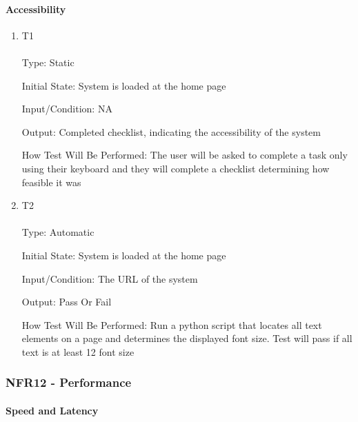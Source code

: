 \documentclass[12pt, titlepage]{article}
\begin{document}
\paragraph{Accessibility}
\begin{enumerate}
\item {T1\\}\\
Type: Static

Initial State: System is loaded at the home page

Input/Condition: NA

Output: Completed checklist, indicating the accessibility of the system

How Test Will Be Performed: The user will be asked to complete a task only using their keyboard and they will complete a checklist determining how feasible it was
\item {T2\\}\\
Type: Automatic

Initial State: System is loaded at the home page

Input/Condition: The URL of the system

Output: Pass Or Fail

How Test Will Be Performed: Run a python script that locates all text elements on a page and determines the displayed font size. Test will pass if all text is at least 12 font size
\end{enumerate}

\hypertarget{nfr12}{}
\subsubsection{NFR12 - Performance}
		
\paragraph{Speed and Latency}
\end{document}

